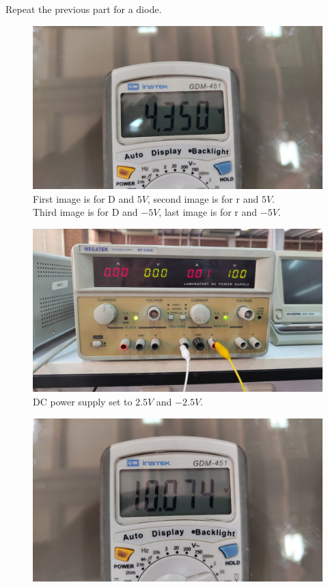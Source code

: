 \documentclass[11pt]{article}
\newcommand{\PicScale}{0.2}
\begin{document}
\begin{question}
\begin{subquestion}{Repeat the previous part for a diode.}
{\begin{figure}[H]
                \includegraphics[scale=0.08,angle=0]{Fig/34.jpeg}
                \caption{First image is for D and $5V$, second image is for r and $5V$. \\
                    \hspace*{14mm} Third image is for D and $-5V$, last image is for r and $-5V$.}
            \end{figure}
            \begin{figure}[H]
                \centering
                \includegraphics[scale=\PicScale,angle=0]{Fig/35.jpeg}
                \caption{DC power supply set to $2.5V$ and $-2.5V$.}
            \end{figure}
            \begin{figure}[H]
                \centering
                \includegraphics[scale=0.08,angle=0]{Fig/36.jpeg}

\end{figure}}
\end{subquestion}
\end{question}
\end{document}
